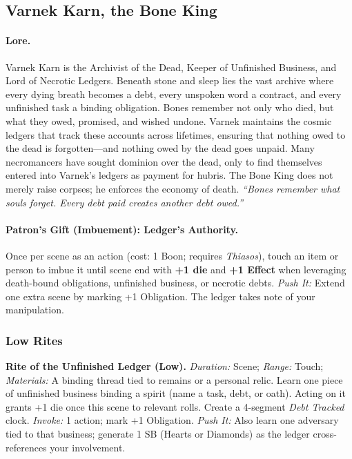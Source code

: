 \subsection{Varnek Karn, the Bone King}
\label{patron:varnek-karn}

\paragraph{Lore.}
Varnek Karn is the Archivist of the Dead, Keeper of Unfinished Business, and Lord of Necrotic Ledgers. Beneath stone and sleep lies the vast archive where every dying breath becomes a debt, every unspoken word a contract, and every unfinished task a binding obligation. Bones remember not only who died, but what they owed, promised, and wished undone. Varnek maintains the cosmic ledgers that track these accounts across lifetimes, ensuring that nothing owed to the dead is forgotten—and nothing owed by the dead goes unpaid. Many necromancers have sought dominion over the dead, only to find themselves entered into Varnek’s ledgers as payment for hubris. The Bone King does not merely raise corpses; he enforces the economy of death.  
\emph{``Bones remember what souls forget. Every debt paid creates another debt owed.''}

\paragraph{Patron's Gift (Imbuement): Ledger's Authority.}
Once per scene as an action (cost: 1 Boon; requires \emph{Thiasos}), touch an item or person to imbue it until scene end with \textbf{+1 die} and \textbf{+1 Effect} when leveraging death-bound obligations, unfinished business, or necrotic debts.  
\emph{Push It:} Extend one extra scene by marking +1 Obligation. The ledger takes note of your manipulation.

\subsubsection*{Low Rites}

\textbf{Rite of the Unfinished Ledger (Low).}  
\emph{Duration:} Scene; \emph{Range:} Touch; \emph{Materials:} A binding thread tied to remains or a personal relic.  
Learn one piece of unfinished business binding a spirit (name a task, debt, or oath). Acting on it grants +1 die once this scene to relevant rolls. Create a 4-segment \emph{Debt Tracked} clock.  
\emph{Invoke:} 1 action; mark +1 Obligation.  
\emph{Push It:} Also learn one adversary tied to that business; generate 1 SB (Hearts or Diamonds) as the ledger cross-references your involvement.

